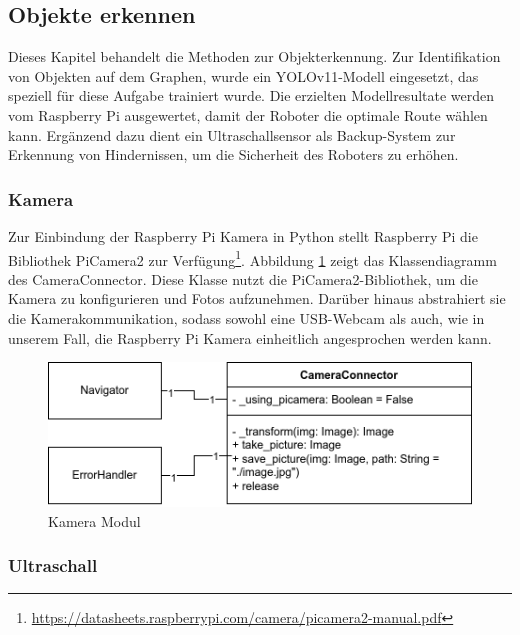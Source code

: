 
\subsection{Objekte erkennen}

Dieses Kapitel behandelt die Methoden zur Objekterkennung. Zur Identifikation von Objekten auf dem Graphen, wurde ein YOLOv11-Modell eingesetzt, das speziell für diese Aufgabe trainiert wurde. Die erzielten Modellresultate werden vom Raspberry Pi ausgewertet, damit der Roboter die optimale Route wählen kann. Ergänzend dazu dient ein Ultraschallsensor als Backup-System zur Erkennung von Hindernissen, um die Sicherheit des Roboters zu erhöhen. 


\subsubsection{Kamera}
\label{camera-connector}

Zur Einbindung der Raspberry Pi Kamera in Python stellt Raspberry Pi die Bibliothek PiCamera2 zur Verfügung\footnote{\url{https://datasheets.raspberrypi.com/camera/picamera2-manual.pdf}}.
Abbildung \ref{fig:camera-connector-classdiagram} zeigt das Klassendiagramm des CameraConnector. Diese Klasse nutzt die PiCamera2-Bibliothek, um die Kamera zu konfigurieren und Fotos aufzunehmen. Darüber hinaus abstrahiert sie die Kamerakommunikation, sodass sowohl eine USB-Webcam als auch, wie in unserem Fall, die Raspberry Pi Kamera einheitlich angesprochen werden kann.

 \begin{figure}[H]
\centering
\includegraphics[width= \textwidth ]{assets/IT/robot-sw-architecture-camera-connector.png}
\caption{Kamera Modul}
\label{fig:camera-connector-classdiagram}
\end{figure}



\subsubsection{Ultraschall}
\label{ultraschall}

